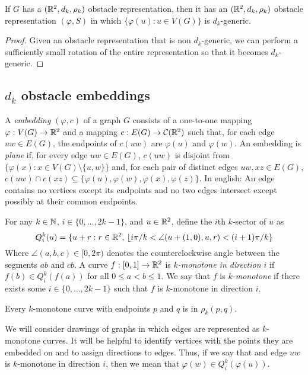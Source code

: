 \documentclass{patmorin}
\begin{document}
\begin{obs}
  If $G$ has a $(\mathbb{R}^2,d_k,\rho_k)$ obstacle representation, then it
  has an $(\mathbb{R}^2,d_k,\rho_k)$ obstacle representation $(\varphi, S)$
  in which $\{\varphi(u):u\in V(G)\}$ is $d_k$-generic.
\end{obs}

\begin{proof}
   Given an obstacle representation that is non $d_k$-generic, we can
   perform a sufficiently small rotation of the entire representation
   so that it becomes $d_k$-generic.
\end{proof}



\subsection{$d_k$ obstacle embeddings}

A \emph{embedding} $(\varphi,c)$ of a graph $G$ consists of a one-to-one
mapping $\varphi:V(G)\to\mathbb{R}^2$ and a mapping $c:E(G)\to \mathcal{C}(\mathbb{R}^2)$
such that, for each edge $uw\in E(G)$, the endpoints of $c(uw)$ are
$\varphi(u)$ and $\varphi(w)$.
An embedding is \emph{plane} if, for every edge $uw\in E(G)$, $c(uw)$ is disjoint from $\{\varphi(x) : x\in V(G)\setminus\{u,w\}\}$ and, for each pair of distinct edges $uw,xz\in E(G)$, $c(uw)\cap c(xz)\subseteq\{\varphi(u),\varphi(w),\varphi(x),\varphi(z)\}$. In english: An edge contains no vertices except its endpoints and no two edges intersect except possibly at their common endpoints.




For any $k\in\mathbb{N}$, $i\in\{0,\ldots,2k-1\}$, and $u\in\mathbb{R}^2$, define the
$i$th $k$-sector of $u$ as
\[
   Q^{k}_i(u) = 
     \{ u+r: r\in\mathbb{R}^2,\,\lfloor i\pi/k < \angle(u+(1,0),u,r) < (i+1)\pi/k \}
\]
Where $\angle (a,b,c)\in[0,2\pi)$ denotes the counterclockwise angle
between the segments $ab$ and $cb$.  A curve $f:[0,1]\to\mathbb{R}^2$ is
\emph{$k$-monotone in direction $i$} if $f(b)\in Q^k_i(f(a))$ for all
$0 \le a < b \le 1$.  We say that $f$ is \emph{$k$-monotone} if there
exists some $i\in\{0,\ldots,2k-1\}$ such that $f$ is $k$-monotone in
direction $i$.

\begin{obs}
   Every $k$-monotone curve with endpoints $p$ and $q$ is in $\rho_k(p,q)$.
\end{obs}

We will consider drawings of graphs in which edges are represented as
$k$-monotone curves.  It will be helpful to identify vertices with the
points they are embedded on and to assign directions to edges. Thus,
if we say that and edge $uw$ is $k$-monotone in direction $i$, then we
mean that $\varphi(w)\in Q^k_i(\varphi(u))$.  
\end{document}
